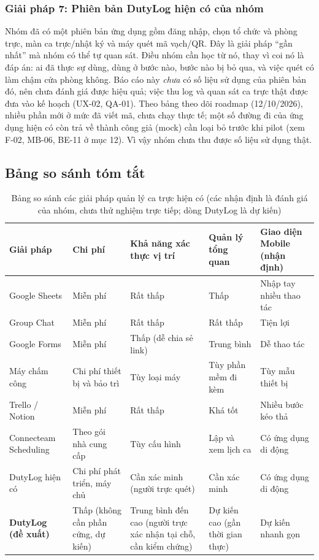 \subsubsection{Giải pháp 7: Phiên bản DutyLog hiện có của nhóm}
Nhóm đã có một phiên bản ứng dụng gồm đăng nhập, chọn tổ chức và phòng trực, màn ca trực/nhật ký và máy quét mã vạch/QR. Đây là giải pháp ``gần nhất'' mà nhóm có thể tự quan sát. Điều nhóm cần học từ nó, thay vì coi nó là đáp án: ai đã thực sự dùng, dùng ở bước nào, bước nào bị bỏ qua, và việc quét có làm chậm cửa phòng không. Báo cáo này \emph{chưa} có số liệu sử dụng của phiên bản đó, nên chưa đánh giá được hiệu quả; việc thu log và quan sát ca trực thật được đưa vào kế hoạch (UX-02, QA-01).
Theo bảng theo dõi roadmap (12/10/2026), nhiều phần mới ở mức đã viết mã, chưa chạy thực tế; một số đường đi của ứng dụng hiện có còn trả về thành công giả (mock) cần loại bỏ trước khi pilot (xem F-02, MB-06, BE-11 ở mục 12). Vì vậy nhóm chưa thu được số liệu sử dụng thật.

\subsection{Bảng so sánh tóm tắt}

\begin{table}[H]
    \centering
    \small
    \renewcommand{\arraystretch}{1.25}
    \begin{tabularx}{\textwidth}{|X|X|X|X|X|}
        \hline
        \textbf{Giải pháp} & \textbf{Chi phí} & \textbf{Khả năng xác thực vị trí} & \textbf{Quản lý tổng quan} & \textbf{Giao diện Mobile (nhận định)} \\
        \hline
        Google Sheets & Miễn phí & Rất thấp & Thấp & Nhập tay nhiều thao tác \\
        \hline
        Group Chat & Miễn phí & Rất thấp & Rất thấp & Tiện lợi \\
        \hline
        Google Forms & Miễn phí & Thấp (dễ chia sẻ link) & Trung bình & Dễ thao tác \\
        \hline
        Máy chấm công & Chi phí thiết bị và bảo trì & Tùy loại máy & Tùy phần mềm đi kèm & Tùy mẫu thiết bị \\
        \hline
        Trello / Notion & Miễn phí & Rất thấp & Khá tốt & Nhiều bước kéo thả \\
        \hline
        Connecteam Scheduling & Theo gói nhà cung cấp & Tùy cấu hình & Lập và xem lịch ca & Có ứng dụng di động \\
        \hline
        DutyLog hiện có & Chi phí phát triển, máy chủ & Cần xác minh (người trực quét) & Cần xác minh & Có ứng dụng di động \\
        \hline
        \textbf{DutyLog (đề xuất)} & Thấp (không cần phần cứng, dự kiến) & Trung bình đến cao (người trực xác nhận tại chỗ, cần kiểm chứng) & Dự kiến cao (gần thời gian thực) & Dự kiến nhanh gọn \\
        \hline
    \end{tabularx}
    \caption{Bảng so sánh các giải pháp quản lý ca trực hiện có (các nhận định là đánh giá của nhóm, chưa thử nghiệm trực tiếp; dòng DutyLog là dự kiến)}
    \label{tab:competitor_comparison}
\end{table}

